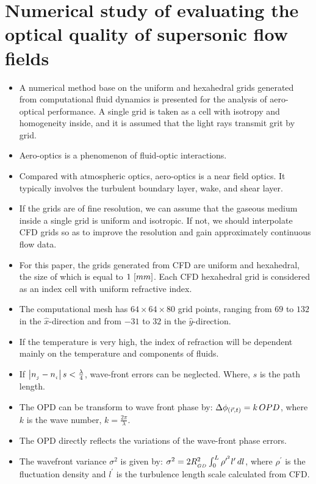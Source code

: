     \section{Numerical study of evaluating the optical quality of supersonic flow fields \cite{wang:ao:2007}}
        \begin{itemize}
            \item A numerical method base on the uniform and hexahedral grids generated from computational fluid dynamics is presented for the analysis of aero-optical performance. A single grid is taken as a cell with isotropy and homogeneity inside, and it is assumed that the light rays transmit grit by grid.  
            \item Aero-optics is a phenomenon of fluid-optic interactions. 
            \item Compared with atmospheric optics, aero-optics is a near field optics. It typically involves the turbulent boundary layer, wake, and shear layer. 
            \item If the grids are of fine resolution, we can assume that the gaseous medium inside a single grid is uniform and isotropic. If not, we should interpolate CFD grids so as to improve the resolution and gain approximately continuous flow data.  
            \item For this paper, the grids generated from CFD are uniform and hexahedral, the size of which is equal to $1\,\left[mm\right]$. Each CFD hexahedral grid is considered as an index cell with uniform refractive index.
            \item The computational mesh has $64\times 64 \times 80$ grid points, ranging from $69$ to $132$ in the $\hat{x}$-direction and from $-31$ to $32$ in the $\hat{y}$-direction.  
            \item If the temperature is very high, the index of refraction will be dependent mainly on the temperature and components of fluids. 
            \item If $\left\lvert n_{_{j}} - n_{_{i}}\right\rvert s < \frac{\lambda}{4} $, wave-front errors can be neglected. Where, $s$ is the path length. 
            \item The OPD can be transform to wave front phase by: $\Delta\phi_{\left(\vec{r},t\right)} = k\,OPD$, where $k$ is the wave number, $k = \frac{2\pi}{\lambda}$.
            \item The OPD directly reflects the variations of the wave-front phase errors. 
            \item The wavefront variance $\sigma^2$ is given by: $\sigma^2 = 2R_{_{GD}}^2 \int^L_0 \rho^{{\prime}^2}l^{\prime}\,dl $, where $\rho^{\prime}$ is the fluctuation density and $l^{\prime}$ is the turbulence length scale calculated from CFD. 

\end{itemize}
